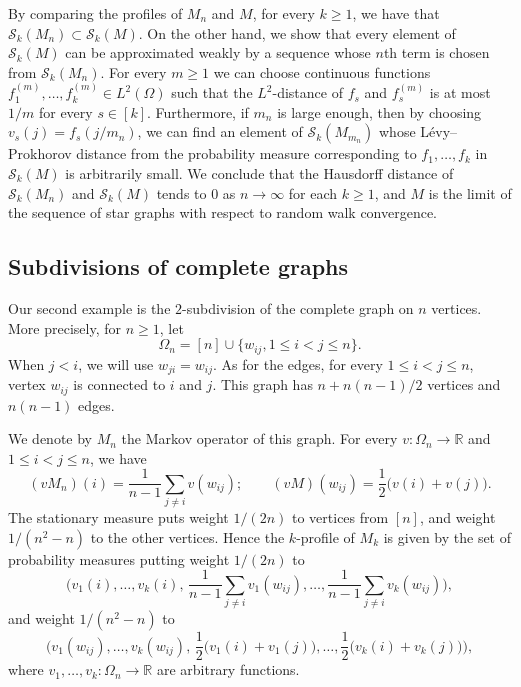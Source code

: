 \documentclass[a4wider]{amsart}
\theoremstyle{definitionbreak}\newtheorem{D}[theorem]{Definition}
\theoremstyle{definitionbreak}\newtheorem*{D*}{Definition}
\begin{document}
By comparing the profiles of $M_n$ and $M$, for every $k\geq 1$, we have that $\mathcal S_k(M_n)\subset \mathcal S_k(M)$. On the other hand, we show that every element of $\mathcal S_k(M)$ can be approximated weakly by a sequence whose $n$th term is chosen from  $\mathcal S_k(M_n)$. For every $m\geq 1$ we can choose continuous functions $f_1^{(m)}, \ldots, f_k^{(m)}\in L^2(\Omega)$ such that the $L^2$-distance of $f_s$ and $f_s^{(m)}$ is at most $1/m$ for every $s\in [k]$. Furthermore, if $m_n$  is large enough, then by choosing $v_s(j)=f_s(j/m_n)$, we can find an element of $\mathcal S_k(M_{m_n})$ whose L\'evy--Prokhorov distance from  the probability measure corresponding to $f_1, \ldots, f_k$ in $\mathcal S_k(M)$ is arbitrarily small. We conclude that the Hausdorff distance of $\mathcal S_k(M_n)$ and $\mathcal S_k(M)$ tends to $0$ as $n\rightarrow\infty$ for each $k\geq 1$, and $M$ is the limit of the sequence of star graphs with respect to random walk convergence. 

\medskip

\subsection{Subdivisions of complete graphs}

Our second example is the $2$-subdivision of the complete graph on $n$ vertices. More precisely, for $n\geq 1$, let 
\[\Omega_n=[n]\cup \{ w_{ij}, 1\leq i<j\leq n\}.\]
When $j<i$, we will use $w_{ji}=w_{ij}$. As for the edges, for every $1\leq i<j\leq n$, vertex $w_{ij}$ is connected to $i$ and $j$. This graph has $n+n(n-1)/2$ vertices and $n(n-1)$ edges.

We denote by $M_n$ the Markov operator of this graph. For every $v:\Omega_n\rightarrow \mathbb R$ and $1\leq i<j\leq n$, we have 
\[(vM_n)(i)=\frac{1}{n-1}\sum_{j\neq i} v(w_{ij}); \qquad (vM)(w_{ij})=\frac 12\big(v(i)+v(j)\big).\]
The stationary measure puts weight $1/(2n)$ to vertices from $[n]$, and weight $1/(n^2-n)$ to the other vertices. Hence the $k$-profile of $M_k$ is given by the set of probability measures putting weight $1/(2n)$ to 
\[\bigg(v_1(i), \ldots, v_k(i),\, \frac{1}{n-1}\sum_{j\neq i} v_1(w_{ij}),\ldots, \frac{1}{n-1}\sum_{j\neq i} v_k(w_{ij})\bigg),\]
and weight $1/(n^2-n)$ to 
\[\bigg(v_1(w_{ij}), \ldots, v_k(w_{ij}), \, \frac 12\big(v_1(i)+v_1(j)\big), \ldots, \frac 12\big(v_k(i)+v_k(j)\big)\bigg),\]
where $v_1, \ldots, v_k: \Omega_n\rightarrow\mathbb R$ are arbitrary functions.
\end{document}
